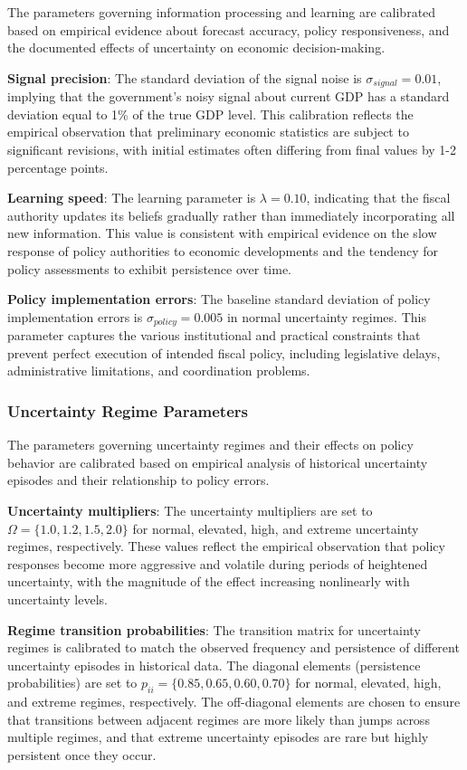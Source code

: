 \documentclass[5p,authoryear]{elsarticle}
\begin{document}
The parameters governing information processing and learning are calibrated based on empirical evidence about forecast accuracy, policy responsiveness, and the documented effects of uncertainty on economic decision-making.

\textbf{Signal precision}: The standard deviation of the signal noise is $\sigma_{signal} = 0.01$, implying that the government's noisy signal about current GDP has a standard deviation equal to 1\% of the true GDP level. This calibration reflects the empirical observation that preliminary economic statistics are subject to significant revisions, with initial estimates often differing from final values by 1-2 percentage points.

\textbf{Learning speed}: The learning parameter is $\lambda = 0.10$, indicating that the fiscal authority updates its beliefs gradually rather than immediately incorporating all new information. This value is consistent with empirical evidence on the slow response of policy authorities to economic developments and the tendency for policy assessments to exhibit persistence over time.

\textbf{Policy implementation errors}: The baseline standard deviation of policy implementation errors is $\sigma_{policy} = 0.005$ in normal uncertainty regimes. This parameter captures the various institutional and practical constraints that prevent perfect execution of intended fiscal policy, including legislative delays, administrative limitations, and coordination problems.

\subsubsection{Uncertainty Regime Parameters}

The parameters governing uncertainty regimes and their effects on policy behavior are calibrated based on empirical analysis of historical uncertainty episodes and their relationship to policy errors.

\textbf{Uncertainty multipliers}: The uncertainty multipliers are set to $\Omega = \{1.0, 1.2, 1.5, 2.0\}$ for normal, elevated, high, and extreme uncertainty regimes, respectively. These values reflect the empirical observation that policy responses become more aggressive and volatile during periods of heightened uncertainty, with the magnitude of the effect increasing nonlinearly with uncertainty levels.

\textbf{Regime transition probabilities}: The transition matrix for uncertainty regimes is calibrated to match the observed frequency and persistence of different uncertainty episodes in historical data. The diagonal elements (persistence probabilities) are set to $p_{ii} = \{0.85, 0.65, 0.60, 0.70\}$ for normal, elevated, high, and extreme regimes, respectively. The off-diagonal elements are chosen to ensure that transitions between adjacent regimes are more likely than jumps across multiple regimes, and that extreme uncertainty episodes are rare but highly persistent once they occur.
\end{document}
